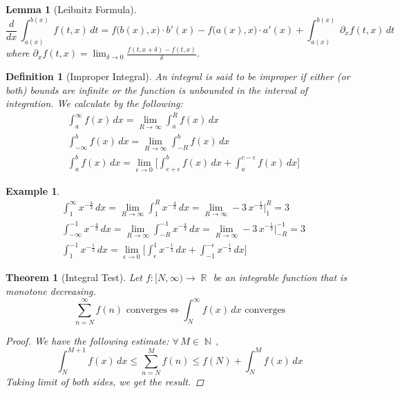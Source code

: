 \documentclass[12pt]{article}
\let\LR\Leftrightarrow
\newcommand{\Forall}[1]{\forall\,{#1}\,,\,}
\DeclareMathOperator{\N}{\mathbb{N}}
\DeclareMathOperator{\R}{\mathbb{R}}
\newtheorem{theorem}{Theorem}[subsection]
\newtheorem{definition}{Definition}[subsection]
\newtheorem{lemma}{Lemma}[subsection]
\newtheorem{example}{Example}[subsection]
\begin{document}
\begin{lemma}[Leibnitz Formula]
  $$ \frac{d}{dx}\,\int_{a(x)}^{b(x)}\,f(t,x)\,dt=f\big(b(x),x\big)\cdot b'(x)-f\big(a(x),x\big)\cdot a'(x)+\int_{a(x)}^{b(x)}\,\partial_x f(t,x)\,dt $$ where $\displaystyle\partial_x f(t,x)=\lim_{\delta\to 0}\frac{f(t,x+\delta)-f(t,x)}{\delta}$.
\end{lemma}

\begin{definition}[Improper Integral]
  An integral is said to be improper if either (or both) bounds are infinite or the function is unbounded in the interval of integration. We calculate by the following:
  \begin{align*}
    &\int^\infty_a f(x)\,dx=\lim_{R\to\infty}\int^R_a f(x)\,dx\\
    &\int^b_{-\infty} f(x)\,dx=\lim_{R\to\infty}\int^b_{-R} f(x)\,dx\\
    &\int^b_a f(x)\,dx=\lim_{\epsilon\to 0}\bigg[\int^b_{c+\epsilon} f(x)\,dx+\int^{c-\epsilon}_a f(x)\,dx\bigg]
  \end{align*}
\end{definition}

\begin{example}
  \begin{align*} 
    &\int^\infty_1 x^{-\frac{4}{3}}\,dx=\lim_{R\to\infty}\int^R_1 x^{-\frac{4}{3}}\,dx=\lim_{R\to\infty}-3\,x^{-\frac{1}{3}}\bigg|^R_1=3\\
    &\int^{-1}_{-\infty} x^{-\frac{4}{3}}\,dx=\lim_{R\to\infty}\int^{-1}_{-R} x^{-\frac{4}{3}}\,dx=\lim_{R\to\infty}-3\,x^{-\frac{1}{3}}\bigg|^{-1}_{-R}=3\\
    &\int^{-1}_1 x^{-\frac{1}{3}}\,dx=\lim_{\epsilon\to 0}\bigg[\int^1_{\epsilon} x^{-\frac{1}{3}}\,dx+\int^{-\epsilon}_{-1} x^{-\frac{1}{3}}\,dx\bigg]
  \end{align*}
\end{example}

\begin{theorem}[Integral Test]
  Let $f:[N,\infty)\to\R$ be an integrable function that is monotone decreasing.
  $$\sum_{n=N}^\infty f(n)\text{ converges}\LR \int_N^\infty f(x)\,dx\text{ converges}$$
  \begin{proof}
    We have the following estimate: $\Forall{M\in\N}$
    $$\int_N^{M+1} f(x)\,dx\leq \sum_{n=N}^M f(n) \leq f(N)+\int_N^M f(x)\,dx$$
    Taking limit of both sides, we get the result.
  \end{proof}
\end{theorem}
\end{document}
